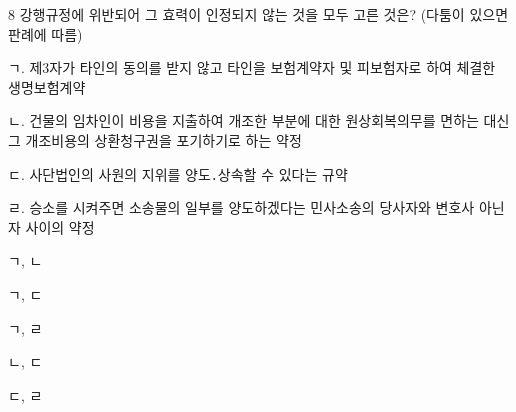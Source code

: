 \begin{question}{8}
강행규정에 위반되어 그 효력이 인정되지 않는 것을 모두 고른 것은? (다툼이 있으면 판례에 따름)
\begin{framedtext}
ㄱ. 제3자가 타인의 동의를 받지 않고 타인을 보험계약자 및 피보험자로 하여 체결한 생명보험계약 \par
ㄴ. 건물의 임차인이 비용을 지출하여 개조한 부분에 대한 원상회복의무를 면하는 대신 그 개조비용의 상환청구권을 포기하기로 하는 약정 \par
ㄷ. 사단법인의 사원의 지위를 양도․상속할 수 있다는 규약 \par
ㄹ. 승소를 시켜주면 소송물의 일부를 양도하겠다는 민사소송의 당사자와 변호사 아닌 자 사이의 약정 \par
\end{framedtext}
\begin{choices}
  \item ㄱ, ㄴ
  \item ㄱ, ㄷ
  \item ㄱ, ㄹ
  \item ㄴ, ㄷ
  \item ㄷ, ㄹ
\end{choices}
\end{question}

